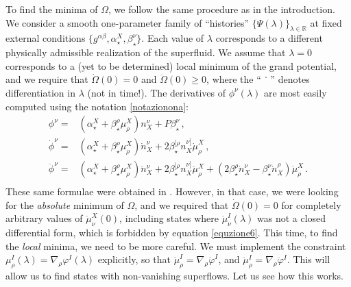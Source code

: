 \documentclass[a4paper, amsfonts, amssymb, amsmath, reprint, showkeys, nofootinbib, twoside,notitlepage,onecolumn]{revtex4-2}
\theoremstyle{definition}
\theoremstyle{theorem}
\theoremstyle{corollary}
\begin{document}
To find the minima of $\Omega$, we follow the same procedure as in the introduction. We consider a smooth one-parameter family of ``histories'' $\{\Psi (\lambda)\}_{\lambda \in \mathbb{R}}$ at fixed external conditions $\{g^{\alpha \beta},\alpha_\star^X, \beta_\star^\nu \}$. Each value of $\lambda$ corresponds to a different physically admissible realization of the superfluid. We assume that $\lambda=0$ corresponds to a (yet to be determined) local minimum of the grand potential, and we require that $\dot{\Omega}(0)=0$ and $\ddot{\Omega}(0) \geq 0$, where the ``$\dot{\textcolor{white}{m}}$'' denotes differentiation in $\lambda$ (not in time!). The derivatives of $\phi^\nu(\lambda)$ are most easily computed using the notation \eqref{notazionona}:
\begin{equation}\label{phioddottorne}
\begin{split}
\phi^\nu={}&(\alpha_\star^X{+}\beta_\star^\rho \mu^X_\rho) n^\nu_X +P \beta_\star^\nu \, , \\
\dot{\phi}^\nu={}& (\alpha_\star^X{+}\beta_\star^\rho \mu^X_\rho) \dot{n}^\nu_X +2 \beta^{[\rho}_\star n^{\nu]}_X \dot{\mu}^X_\rho \, , \\
\ddot{\phi}^\nu={}& (\alpha_\star^X{+}\beta_\star^\rho \mu^X_\rho) \ddot{n}^\nu_X +2 \beta^{[\rho}_\star n^{\nu]}_X \ddot{\mu}^X_\rho  + (2\beta^{\rho}_\star \dot{n}^{\nu}_X{-}\beta^{\nu}_\star \dot{n}^{\rho}_X) \dot{\mu}^X_\rho \, . \\
\end{split}
\end{equation}
These same formulae were obtained in \cite{GavassinoStabilityCarter2022}. However, in that case, we were looking for the \textit{absolute} minimum of $\Omega$, and we required that $\dot{\Omega}(0)=0$ for completely arbitrary values of $\dot{\mu}^X_\nu(0)$, including states where $\dot{\mu}^I_\nu(\lambda)$ was not a closed differential form, which is forbidden by equation \eqref{equzione6}. This time, to find the \textit{local} minima, we need to be more careful. We must implement the constraint 
$\mu^I_\rho(\lambda) =\nabla_\rho \varphi^I(\lambda)$ explicitly, so that $\dot{\mu}^I_\rho =\nabla_\rho \dot{\varphi}^I$, and $\ddot{\mu}^I_\rho =\nabla_\rho \ddot{\varphi}^I$. This will allow us to find states with non-vanishing superflows. Let us see how this works.
\end{document}
